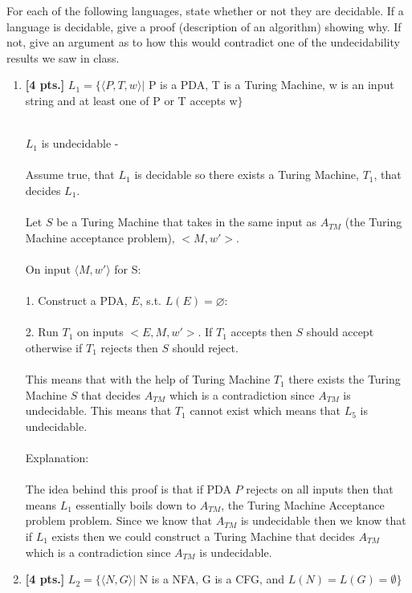 \documentclass[11pt]{article}
\theoremstyle{definition}
\theoremstyle{theorem}
\newcommand{\solution}{\medskip\noindent{\color{blue}\textbf{Solution:}}}
\begin{document}
For each of the following languages, state whether or not they are decidable. If a language is decidable, give a proof (description of an algorithm) showing why. If not, give an argument as to how this would contradict one of the undecidability results we saw in class.

\begin{enumerate}[label=(\alph*)]


\item \textbf{[4 pts.]} $L_1 = \{ \langle P, T, w \rangle |$ P is a PDA, T is a Turing Machine, w is an input string and at least one of P or T accepts w$\}$

\solution \\
$L_1$ is undecidable - \\~\\
Assume true, that $L_1$ is decidable so there exists a Turing Machine, $T_1$, that decides $L_1$. \\~\\
\noindent Let $S$ be a Turing Machine that takes in the same input as $A_{TM}$ (the Turing Machine acceptance problem), $<M, w'>$. \\~\\
\noindent On input $\langle M, w' \rangle$ for S: \\~\\
1. Construct a PDA, $E$, s.t. $L(E) = \varnothing$: \\~\\
2. Run $T_1$ on inputs $<E, M, w'>$. If $T_1$ accepts then $S$ should accept otherwise if $T_1$ rejects then $S$ should reject. \\~\\
This means that with the help of Turing Machine $T_1$ there exists the Turing Machine $S$ that decides $A_{TM}$ which is a contradiction since $A_{TM}$ is undecidable. This means that $T_1$ cannot exist which means that $L_5$ is undecidable. \\~\\
Explanation: \\~\\
The idea behind this proof is that if PDA $P$ rejects on all inputs then that means $L_1$ essentially boils down to $A_{TM}$, the Turing Machine Acceptance problem problem. Since we know that $A_{TM}$ is undecidable then we know that if $L_1$ exists then we could construct a Turing Machine that decides $A_{TM}$ which is a contradiction since $A_{TM}$ is undecidable.


\newpage
\item \textbf{[4 pts.]} $L_2 = \{ \langle N, G \rangle |$ N is a NFA, G is a CFG, and $L(N) = L(G) = \emptyset \}$


\end{enumerate}
\end{document}
